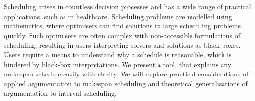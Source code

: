 Scheduling arises in countless decision processes and has a wide range of practical applications, such as in healthcare. Scheduling problems are modelled using mathematics, where optimisers can find solutions to large scheduling problems quickly. Such optimisers are often complex with non-accessible formulations of scheduling, resulting in users interpreting solvers and solutions as black-boxes. Users require a means to understand why a schedule is reasonable, which is hindered by black-box interpretations.
\linespace
We present a tool, \emph{\toolname} that explains any makespan schedule easily with clarity. We will explore practical considerations of applied argumentation to makespan scheduling and theoretical generalisations of argumentation to interval scheduling.